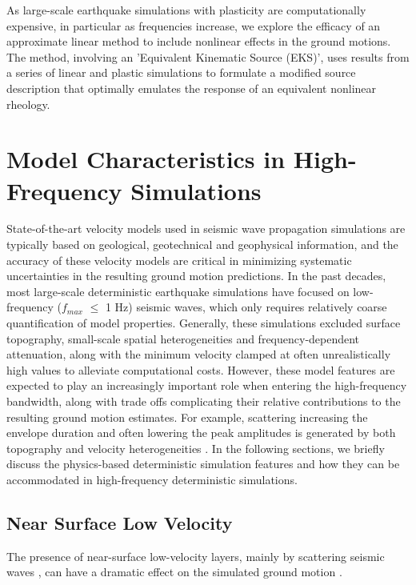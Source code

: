  As large-scale earthquake simulations with plasticity are computationally expensive, in particular as frequencies increase, we explore the efficacy of an approximate linear method to include nonlinear effects in the ground motions. The method, involving an 'Equivalent Kinematic Source (EKS)', uses results from a series of linear and plastic simulations to formulate a modified source description that optimally emulates the response of an equivalent nonlinear rheology.



\section{Model Characteristics in High-Frequency Simulations}

State-of-the-art velocity models used in seismic wave propagation simulations are typically based on geological, geotechnical and geophysical information, and the accuracy of these velocity models are critical in minimizing systematic uncertainties in the resulting ground motion predictions. In the past decades, most large-scale deterministic earthquake simulations have focused on low-frequency ($f_{max}$ $\leqslant$ 1 Hz) seismic waves, which only requires relatively coarse quantification of model properties. Generally, these simulations excluded surface topography, small-scale spatial heterogeneities and frequency-dependent attenuation, along with the minimum velocity clamped at often unrealistically high values to alleviate computational costs. However, these model features are expected to play an increasingly important role when entering the high-frequency bandwidth, along with trade offs complicating their relative contributions to the resulting ground motion estimates. For example, scattering increasing the envelope duration and often lowering the peak amplitudes is generated by both topography and velocity heterogeneities \citet{laiShallowBasinStructure2020}.
In the following sections, we briefly discuss the physics-based deterministic simulation features and how they can be accommodated in high-frequency deterministic simulations.


\subsection{Near Surface Low Velocity}
The presence of near-surface low-velocity layers, mainly by scattering seismic waves , can have a dramatic effect on the simulated ground motion .

